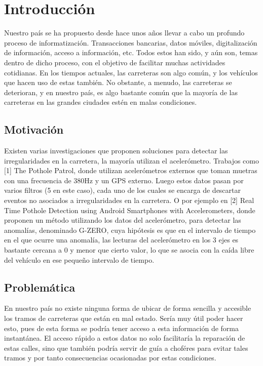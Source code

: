 \chapter*{Introducción}\label{chapter:introduction}

Nuestro país se ha propuesto desde hace unos años llevar a cabo un profundo proceso de informatización. Transacciones bancarias, datos móviles, digitalización de información, acceso a información, etc. Todos estos han sido, y aún son, temas dentro de dicho proceso, con el objetivo de facilitar muchas actividades cotidianas. En los tiempos actuales, las carreteras son algo común, y los vehículos que hacen uso de estas también. No obstante, a menudo, las carreteras se deterioran, y en nuestro país, es algo bastante común que la mayoría de las carreteras en las grandes ciudades estén en malas condiciones.

\section*{Motivación}
Existen varias investigaciones que proponen soluciones para detectar las irregularidades en la carretera, la mayoría utilizan el acelerómetro. Trabajos como [1] The Pothole Patrol, donde utilizan acelerómetros externos que toman muetras con una frecuencia de 380Hz y un GPS externo. Luego estos datos pasan por varios filtros (5 en este caso), cada uno de los cuales se encarga de descartar eventos no asociados a irregularidades en la carretera. O por ejemplo en [2] Real Time Pothole Detection using Android Smartphones with Accelerometers, donde proponen un método utilizando los datos del acelerómetro, para detectar las anomalías, denominado G-ZERO, cuya hipótesis es que en el intervalo de tiempo en el que ocurre una anomalía, las lecturas del acelerómetro en los 3 ejes es bastante cercana a 0 y menor que cierto valor, lo que se asocia con la caída libre del vehículo en ese pequeño intervalo de tiempo.

\section*{Problemática}
En nuestro país no existe ninguna forma de ubicar de forma sencilla y accesible los tramos de carreteras que están en mal estado. Sería muy útil poder hacer esto, pues de esta forma se podría tener acceso a esta información de forma instantánea. El acceso rápido a estos datos no solo facilitaría la reparación de estas calles, sino que también podría servir de guía a choféres para evitar tales tramos y por tanto consecuencias ocasionadas por estas condiciones.

